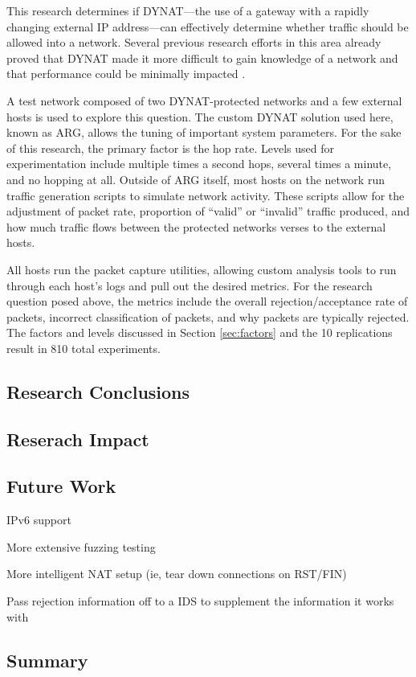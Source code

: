 \par This research determines if \ac{DYNAT}---the use of a gateway with a rapidly changing external \ac{IP} address---can effectively determine whether traffic should be allowed into a network. Several previous research efforts in this area already proved that \ac{DYNAT} made it more difficult to gain knowledge of a network \cite{BBNDYNAT} and that performance could be minimally impacted \cite{NAH}. 

\par A test network composed of two \ac{DYNAT}-protected networks and a few external hosts is used to explore this question. The custom \ac{DYNAT} solution used here, known as \ac{ARG}, allows the tuning of important system parameters. For the sake of this research, the primary factor is the hop rate. Levels used for experimentation include multiple times a second hops, several times a minute, and no hopping at all. Outside of \ac{ARG} itself, most hosts on the network run traffic generation scripts to simulate network activity. These scripts allow for the adjustment of packet rate, proportion of ``valid'' or ``invalid'' traffic produced, and how much traffic flows between the protected networks verses to the external hosts.

\par All hosts run the packet capture utilities, allowing custom analysis tools to run through each host's logs and pull out the desired metrics. For the research question posed above, the metrics include the overall rejection/acceptance rate of packets, incorrect classification of packets, and why packets are typically rejected. The factors and levels discussed in Section \ref{sec:factors} and the 10 replications result in 810 total experiments.

\subsection{Research Conclusions}

\subsection{Reserach Impact}


\subsection{Future Work}
\par IPv6 support
\par More extensive fuzzing testing
\par More intelligent NAT setup (ie, tear down connections on RST/FIN)
\par Pass rejection information off to a \ac{IDS} to supplement the information it works with

\subsection{Summary}

